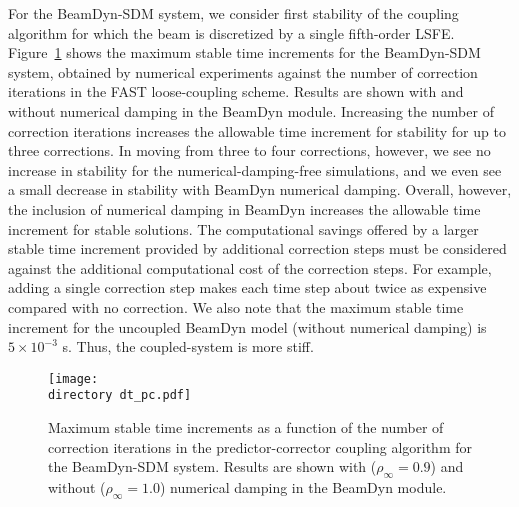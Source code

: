 \documentclass{aiaa-tc}
\def\directory{EPSF/}
\begin{document}
For the BeamDyn-SDM system, we consider first stability of the coupling algorithm for which the beam is discretized by a single fifth-order LSFE. 
Figure~\ref{fig:CoupledDTPC} shows the maximum stable time increments for the BeamDyn-SDM system, obtained by numerical experiments against the number of correction iterations in the FAST loose-coupling scheme.  Results are shown with and without numerical damping in the BeamDyn module.
Increasing the number of correction iterations increases the allowable time increment for stability for up to three corrections.  In moving from three to four corrections, however, we see no increase in stability for the numerical-damping-free simulations, and we even see a small decrease in stability with BeamDyn numerical damping.  Overall, however, the inclusion of numerical damping in BeamDyn increases the allowable time increment for stable solutions.
The computational savings offered by a larger stable time increment provided by additional correction steps must be considered against the additional computational cost of the correction steps.  
For example, adding a single correction step makes each time step about twice as expensive compared with no correction.
We also note that the maximum stable time increment for the uncoupled BeamDyn model (without numerical damping) is $5 \times 10^{-3}$ s.  Thus, the coupled-system is more stiff.

\begin{figure}[h!tp]
\centering
\texttt{[image: \\directory dt\_pc.pdf]}
\caption{Maximum stable time increments as a function of the number of correction iterations in the predictor-corrector coupling algorithm for the BeamDyn-SDM system. Results are shown with ($\rho_\infty = 0.9$) and without ($\rho_\infty = 1.0$) numerical damping in the BeamDyn module.
} 
\label{fig:CoupledDTPC}
\end{figure}
\end{document}
